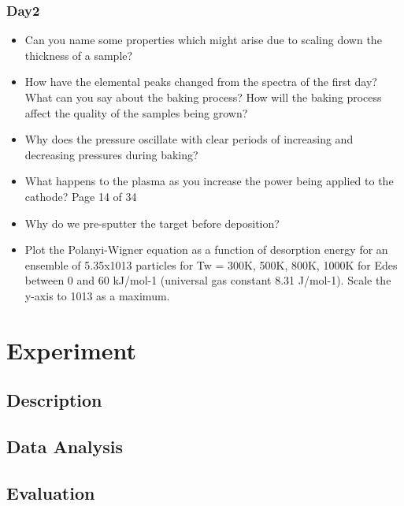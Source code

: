 \documentclass[]{article}
\begin{document}
\subsubsection{Day2}
\begin{itemize}
	 \item Can you name some properties which might arise due to scaling down the thickness of a sample? \item How have the elemental peaks changed from the spectra of the ﬁrst day? What can you say about the baking process? How will the baking process aﬀect the quality of the samples being grown? \item Why does the pressure oscillate with clear periods of increasing and decreasing pressures during baking? \item What happens to the plasma as you increase the power being applied to the cathode?
	Page 14 of 34
	\item Why do we pre-sputter the target before deposition? \item  Plot the Polanyi-Wigner equation as a function of desorption energy for an ensemble of 5.35x1013 particles for Tw = 300K, 500K, 800K, 1000K for Edes between 0 and 60 kJ/mol-1 (universal gas constant 8.31 J/mol-1). Scale the y-axis to 1013 as a maximum.
	
\end{itemize}
\section{Experiment}
\subsection{Description}
\subsection{Data Analysis}
\subsection{Evaluation}
\end{document}
